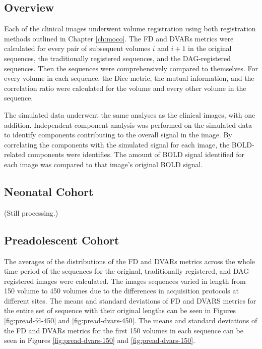 \subsection{Overview}

Each of the clinical images underwent volume registration using both registration methods outlined in Chapter \ref{ch:moco}. The FD and DVARs metrics were calculated for every pair of subsequent volumes $i$ and $i+1$ in the original sequences, the traditionally registered sequences, and the DAG-registered sequences. Then the sequences were comprehensively compared to themselves. For every volume in each sequence, the Dice metric, the mutual information, and the correlation ratio were calculated for the volume and every other volume in the sequence.

The simulated data underwent the same analyses as the clinical images, with one addition. Independent component analysis was performed on the simulated data to identify components contributing to the overall signal in the image. By correlating the components with the simulated signal for each image, the BOLD-related components were identifies. The amount of BOLD signal identified for each image was compared to that image's original BOLD signal.

\subsection{Neonatal Cohort}

(Still processing.)

\subsection{Preadolescent Cohort}




The averages of the distributions of the FD and DVARs metrics across the whole time period of the sequences for the original, traditionally registered, and DAG-registered images were calculated. The images sequences varied in length from 150 volume to 450 volumes due to the differences in acquisition protocols at different sites. The means and standard deviations of FD and DVARS metrics for the entire set of sequence with their original lengths can be seen in Figures \ref{fig:pread-fd-450} and \ref{fig:pread-dvars-450}. The means and standard deviations of the FD and DVARs metrics for the first 150 volumes in each sequence can be seen in Figures \ref{fig:pread-dvars-150} and \ref{fig:pread-dvars-150}. 


